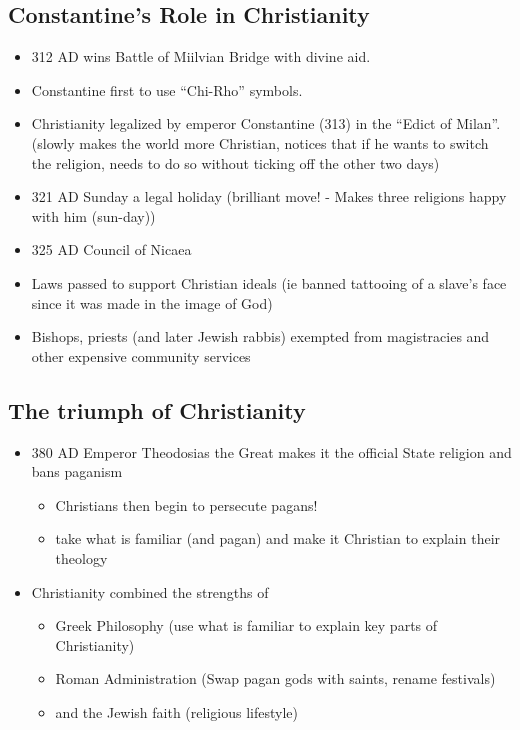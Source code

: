 \documentclass[12pt, twoside]{article}
\begin{document}
\subsection{Constantine's Role in Christianity}
\begin{itemize}
\item 312 AD wins Battle of Miilvian Bridge with divine aid.
\item Constantine first to use “Chi-Rho” symbols.
\item Christianity legalized by emperor Constantine (313) in the “Edict of Milan”. (slowly makes the world more Christian, notices that if he wants to switch the religion, needs to do so without ticking off the other two days)
\item 321 AD Sunday a legal holiday (brilliant move! - Makes three religions happy with him (sun-day))
\item 325 AD Council of Nicaea
\item Laws passed to support  Christian ideals (ie banned tattooing of a slave’s face since it was made in the image of God)
\item Bishops, priests (and later Jewish rabbis) exempted from magistracies and other expensive community services
\end{itemize}

\subsection{The triumph of Christianity}
\begin{itemize}
\item 380 AD Emperor Theodosias the Great makes it the official State religion and bans paganism
	\begin{itemize}
	\item Christians then begin to persecute pagans!
	\item take what is familiar (and pagan) and make it Christian to explain their theology
	\end{itemize}
\item Christianity combined the strengths of
	\begin{itemize}
	\item Greek Philosophy (use what is familiar to explain key parts of Christianity)
	\item Roman Administration (Swap pagan gods with saints, rename festivals)
	\item and the Jewish faith (religious lifestyle)
	\end{itemize}
\end{itemize}
\end{document}
